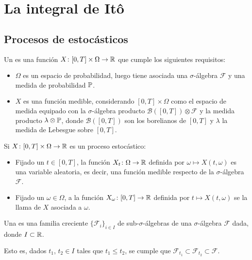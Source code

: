 
\chapter{La integral de Itô}
\label{chap:weiner}

\section{Procesos de estocásticos}
\label{sec:weiner:estocasticos}

\begin{definicion}
    \label{def:proceso_estocastico}
    Un  es una función $X\colon[0,T]\times\Omega\to\mathbb{R}$ que cumple los siguientes requisitos:
    \begin{itemize}
        \item $\Omega$ es un espacio de probabilidad, luego tiene asociada una $\sigma$-álgebra $\mathcal{F}$ y una medida de probabilidad $\mathbb{P}$.
        \item $X$ es una función medible, considerando $[0,T]\times\Omega$ como el espacio de medida equipado con la $\sigma$-álgebra producto $\mathcal{B}([0,T])\otimes\mathcal{F}$ y la medida producto $\lambda\otimes\mathbb{P}$, donde $\mathcal{B}([0,T])$ son los borelianos de $[0,T]$ y $\lambda$ la medida de Lebesgue sobre $[0,T]$.
    \end{itemize}
\end{definicion}

\begin{observacion}
    Si $X\colon[0,T]\times\Omega\to\mathbb{R}$ es un proceso estocástico:
    \begin{itemize}
        \item Fijado un $t\in[0,T]$, la función $X_t\colon\Omega\to\mathbb{R}$ definida por $\omega\mapsto X(t,\omega)$ es una variable aleatoria, es decir, una función medible respecto de la $\sigma$-álgebra $\mathcal{F}$.
        \item Fijado un $\omega\in\Omega$, a la función $X_\omega\colon[0,T]\to\mathbb{R}$ definida por $t\mapsto X(t,\omega)$ se la llama  de $X$ asociada a $\omega$.
    \end{itemize}
\end{observacion}

\begin{definicion}[Filtración]
    \label{def:filtracion}
    Una  es una familia creciente $\{\mathcal{F}_i\}_{i\in I}$ de sub-$\sigma$-álgebras de una $\sigma$-álgebra $\mathcal{F}$ dada, donde $I\subset\mathbb{R}$.

    Esto es, dados $t_1$, $t_2\in I$ tales que $t_1\leq t_2$, se cumple que $\mathcal{F}_{t_1}\subset\mathcal{F}_{t_2}\subset\mathcal{F}$.
\end{definicion}

